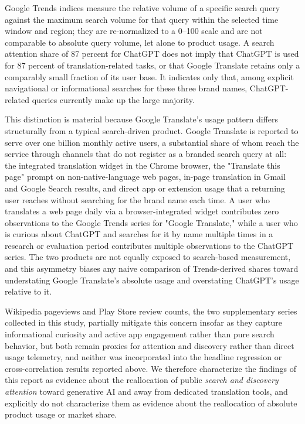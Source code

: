 \documentclass[11pt]{article}
\begin{document}
Google Trends indices measure the relative volume of a specific search query against the maximum search volume for that query within the selected time window and region; they are re-normalized to a 0--100 scale and are not comparable to absolute query volume, let alone to product usage. A search attention share of 87 percent for ChatGPT does not imply that ChatGPT is used for 87 percent of translation-related tasks, or that Google Translate retains only a comparably small fraction of its user base. It indicates only that, among explicit navigational or informational searches for these three brand names, ChatGPT-related queries currently make up the large majority.

This distinction is material because Google Translate's usage pattern differs structurally from a typical search-driven product. Google Translate is reported to serve over one billion monthly active users, a substantial share of whom reach the service through channels that do not register as a branded search query at all: the integrated translation widget in the Chrome browser, the "Translate this page" prompt on non-native-language web pages, in-page translation in Gmail and Google Search results, and direct app or extension usage that a returning user reaches without searching for the brand name each time. A user who translates a web page daily via a browser-integrated widget contributes zero observations to the Google Trends series for "Google Translate," while a user who is curious about ChatGPT and searches for it by name multiple times in a research or evaluation period contributes multiple observations to the ChatGPT series. The two products are not equally exposed to search-based measurement, and this asymmetry biases any naive comparison of Trends-derived shares toward understating Google Translate's absolute usage and overstating ChatGPT's usage relative to it.

Wikipedia pageviews and Play Store review counts, the two supplementary series collected in this study, partially mitigate this concern insofar as they capture informational curiosity and active app engagement rather than pure search behavior, but both remain proxies for attention and discovery rather than direct usage telemetry, and neither was incorporated into the headline regression or cross-correlation results reported above. We therefore characterize the findings of this report as evidence about the reallocation of public \emph{search and discovery attention} toward generative AI and away from dedicated translation tools, and explicitly do not characterize them as evidence about the reallocation of absolute product usage or market share.
\end{document}
